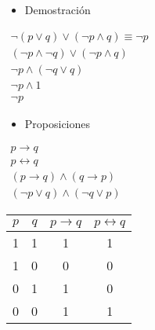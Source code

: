 \documentclass[12pt]{article}
\begin{document}
\begin{itemize}[label=\color{red}\textbullet, leftmargin=*]
	\item \color{lightblue}Demostración
\end{itemize}
$\begin{array}{c}
	\neg(p\vee q)\vee(\neg p\wedge q)\equiv\neg p\\
	(\neg p\wedge\neg q)\vee(\neg p\wedge q)\\
	\neg p\wedge(\neg q\vee q)\\
	\neg p\wedge1\\
	\neg p
\end{array}$
\begin{itemize}[label=\color{red}\textbullet, leftmargin=*]
	\item \color{lightblue}Proposiciones
\end{itemize}
$\begin{array}{l}
	p\rightarrow q\\
	p\leftrightarrow q\\
	(p\rightarrow q)\wedge(q\rightarrow p)\\
	(\neg p\vee q)\wedge(\neg q\vee p)
\end{array}\qquad$
\begin{tabular}{|c|c|c|c|}
	\hline
	\rowcolor{lightblue!50}
	\hline
	$p$ & $q$ & $p\rightarrow q$ & $p\leftrightarrow q$ \\ \hline
	1   & 1   & 1                & 1                    \\ \hline
	1   & 0   & 0                & 0                    \\ \hline
	0   & 1   & 1                & 0                    \\ \hline
	0   & 0   & 1                & 1                    \\ \hline
\end{tabular}
\end{document}
